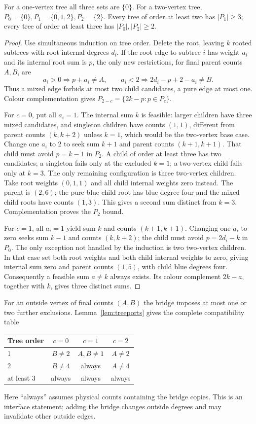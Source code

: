\begin{lemma}\label{lem:treeports}
For a one-vertex tree all three sets are $\{0\}$. For a two-vertex tree,
$P_0=\{0\},P_1=\{0,1,2\},P_2=\{2\}$. Every tree of order at least two
has $|P_1|\ge3$; every tree of order at least three has
$|P_0|,|P_2|\ge2$.
\end{lemma}
\begin{proof}
Use simultaneous induction on tree order. Delete the root, leaving
$k$ rooted subtrees with root internal degrees $d_i$. If the root edge
to subtree $i$ has weight $a_i$ and its internal root sum is $p$, the
only new restrictions, for final parent counts $A,B$, are
\[
 a_i>0\Rightarrow p+a_i\ne A,\qquad
 a_i<2\Rightarrow2d_i-p+2-a_i\ne B.
\]
Thus a mixed edge forbids at most two child candidates, a pure edge at
most one. Colour complementation gives
$P_{2-c}=\{2k-p:p\in P_c\}$.

For $c=0$, put all $a_i=1$. The internal sum $k$ is feasible: larger
children have three mixed candidates, and singleton children have
counts $(1,1)$, different from parent counts $(k,k+2)$ unless $k=1$,
which would be the two-vertex base case. Change one $a_i$ to 2 to seek
sum $k+1$ and parent counts $(k+1,k+1)$. That child must avoid
$p=k-1$ in $P_2$. A child of order at least three has two candidates;
a singleton fails only at the excluded $k=1$; a two-vertex child fails
only at $k=3$. The only remaining configuration is three two-vertex
children. Take root weights $(0,1,1)$ and all child internal weights
zero instead. The parent is $(2,6)$; the pure-blue child root has blue
degree four and the mixed child roots have counts $(1,3)$. This gives
a second sum distinct from $k=3$. Complementation proves the $P_2$ bound.

For $c=1$, all $a_i=1$ yield sum $k$ and counts $(k+1,k+1)$.
Changing one $a_i$ to zero seeks sum $k-1$ and counts $(k,k+2)$;
the child must avoid $p=2d_i-k$ in $P_0$. The only exception not
handled by the induction is two two-vertex children. In that case set
both root weights and both child internal weights to zero, giving
internal sum zero and parent counts $(1,5)$, with child blue degrees
four. Consequently a feasible sum $a\ne k$ always exists. Its colour
complement $2k-a$, together with $k$, gives three distinct sums.
\end{proof}

For an outside vertex of final counts $(A,B)$ the bridge imposes at
most one or two further exclusions. Lemma~\ref{lem:treeports} gives the
complete compatibility table
\begin{center}
\begin{tabular}{lccc}\toprule
Tree order&$c=0$&$c=1$&$c=2$\\\midrule
1&$B\ne2$&$A,B\ne1$&$A\ne2$\\
2&$B\ne4$&always&$A\ne4$\\
at least 3&always&always&always\\\bottomrule
\end{tabular}
\end{center}
Here ``always'' assumes physical counts containing the bridge copies.
This is an interface statement; adding the bridge changes outside
degrees and may invalidate other outside edges.

